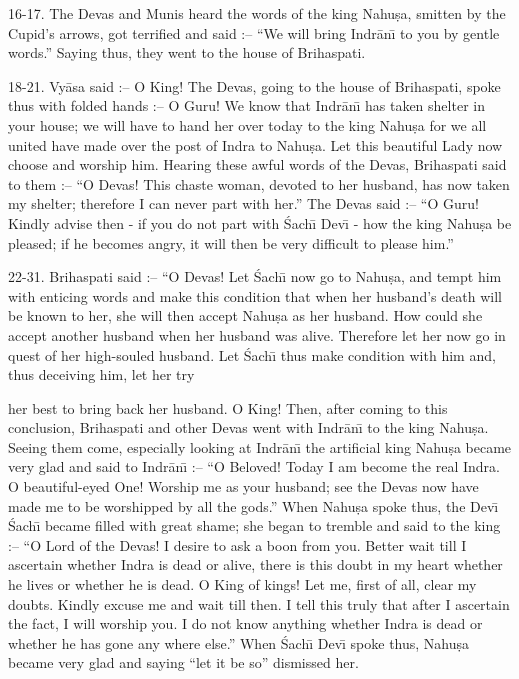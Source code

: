 16-17. The Devas and Munis heard the words of the king Nahu\d{s}a, smitten by the Cupid's arrows, got terrified and said :-- ``We will bring Indr\=an\={\i} to you by gentle words.'' Saying thus, they went to the house of Brihaspati.

18-21. Vy\=asa said :-- O King! The Devas, going to the house of Brihaspati, spoke thus with folded hands :-- O Guru! We know that Indr\=an\={\i} has taken shelter in your house; we will have to hand her over today to the king Nahu\d{s}a for we all united have made over the post of Indra to Nahu\d{s}a. Let this beautiful Lady now choose and worship him. Hearing these awful words of the Devas, Brihaspati said to them :-- ``O Devas! This chaste woman, devoted to her husband, has now taken my shelter; therefore I can never part with her.'' The Devas said :-- ``O Guru! Kindly advise then - if you do not part with \'Sach\={\i} Dev\={\i} - how the king Nahu\d{s}a be pleased; if he becomes angry, it will then be very difficult to please him.''

22-31. Brihaspati said :-- ``O Devas! Let \'Sach\={\i} now go to Nahu\d{s}a, and tempt him with enticing words and make this condition that when her husband's death will be known to her, she will then accept Nahu\d{s}a as her husband. How could she accept another husband when her husband was alive. Therefore let her now go in quest of her high-souled husband. Let \'Sach\={\i} thus make condition with him and, thus deceiving him, let her try

her best to bring back her husband. O King! Then, after coming to this conclusion, Brihaspati and other Devas went with Indr\=an\={\i} to the king Nahu\d{s}a. Seeing them come, especially looking at Indr\=an\={\i} the artificial king Nahu\d{s}a became very glad and said to Indr\=an\={\i} :-- ``O Beloved! Today I am become the real Indra. O beautiful-eyed One! Worship me as your husband; see the Devas now have made me to be worshipped by all the gods.'' When Nahu\d{s}a spoke thus, the Dev\={\i} \'Sach\={\i} became filled with great shame; she began to tremble and said to the king :-- ``O Lord of the Devas! I desire to ask a boon from you. Better wait till I ascertain whether Indra is dead or alive, there is this doubt in my heart whether he lives or whether he is dead. O King of kings! Let me, first of all, clear my doubts. Kindly excuse me and wait till then. I tell this truly that after I ascertain the fact, I will worship you. I do not know anything whether Indra is dead or whether he has gone any where else.'' When \'Sach\={\i} Dev\={\i} spoke thus, Nahu\d{s}a became very glad and saying ``let it be so'' dismissed her.

